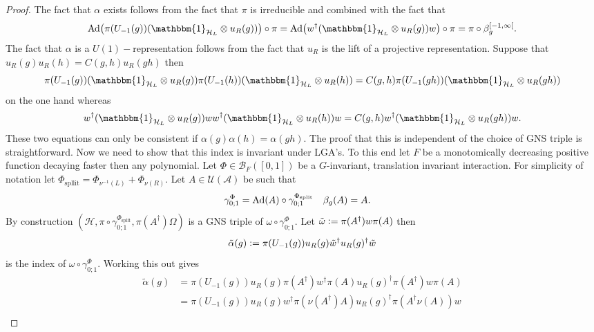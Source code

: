 \documentclass[12pt,a4paper,twoside]{article}
\newcommand{\defeq}{\vcentcolon=}
\let\originalleft\left
\let\originalright\right
\renewcommand{\left}{\mathopen{}\mathclose\bgroup\originalleft}
\renewcommand{\right}{\aftergroup\egroup\originalright}
\newcommand{\UU}{\mathcal U}
\newcommand{\BB}{\mathcal B}
\newcommand{\HH}{\mathcal H}
\renewcommand{\AA}{\mathcal A}
\newcommand{\id}{\mathbbm{1}}
\newcommand{\Ad}[1]{\textrm{Ad}\left(#1\right)}
\theoremstyle{definition}
\numberwithin{equation}{section}
\begin{document}
\begin{proof}
	The fact that $\alpha$ exists follows from the fact that $\pi$ is irreducible and combined with the fact that
	\begin{equation}
		\Ad{\pi(U_{-1}(g)) (\id_{\HH_L}\otimes u_R(g))}\circ\pi=\Ad{w^\dagger(\id_{\HH_L}\otimes u_R(g)) w}\circ\pi=\pi\circ\beta_g^{[-1,\infty[}.
	\end{equation}
	The fact that $\alpha$ is a $U(1)-$representation follows from the fact that $u_R$ is the lift of a projective representation. Suppose that $u_R(g)u_R(h)=C(g,h)u_R(gh)$ then
	\begin{equation}
		\pi(U_{-1}(g)) (\id_{\HH_L}\otimes u_R(g))\pi(U_{-1}(h)) (\id_{\HH_L}\otimes u_R(h))=C(g,h)\pi(U_{-1}(gh)) (\id_{\HH_L}\otimes u_R(gh))
	\end{equation}
	on the one hand whereas
	\begin{equation}
		w^\dagger(\id_{\HH_L}\otimes u_R(g)) ww^\dagger(\id_{\HH_L}\otimes u_R(h)) w=C(g,h)w^\dagger(\id_{\HH_L}\otimes u_R(gh)) w.
	\end{equation}
	These two equations can only be consistent if $\alpha(g)\alpha(h)=\alpha(gh)$. The proof that this is independent of the choice of GNS triple is straightforward. Now we need to show that this index is invariant under LGA's. To this end let $F$ be a monotomically decreasing positive function decaying faster then any polynomial. Let $\Phi\in\BB_F([0,1])$ be a $G$-invariant, translation invariant interaction. For simplicity of notation let $\Phi_{\text{spllit}}=\Phi_{\nu^{-1}(L)}+\Phi_{\nu(R)}$. Let $A\in\UU(\AA)$ be such that
	\begin{align}\label{eq:DefinitionSplitting1DAppendix}
		\gamma^\Phi_{0;1}&=\Ad{A}\circ\gamma^{\Phi_{\text{split}}}_{0;1}&\beta_g(A)&=A.
	\end{align}
	By construction $(\HH,\pi\circ\gamma^{\Phi_{\text{split}}}_{0;1},\pi(A^\dagger)\Omega)$ is a GNS triple of $\omega\circ\gamma^\Phi_{0;1}$. Let $\tilde{\omega}\defeq \pi(A^\dagger)w\pi(A)$ then
	\begin{equation}
		\tilde{\alpha}(g)\defeq \pi(U_{-1}(g))u_R(g)\tilde{w}^\dagger u_R(g)^\dagger \tilde{w}
	\end{equation}
	is the index of $\omega\circ\gamma^\Phi_{0;1}$. Working this out gives
	\begin{align}
		\tilde{\alpha}(g)&=\pi(U_{-1}(g))u_R(g)\pi(A^\dagger)w^\dagger\pi(A)u_R(g)^\dagger\pi(A^\dagger)w\pi(A)\\
		&=\pi(U_{-1}(g))u_R(g)w^\dagger \pi(\nu(A^\dagger)A)u_R(g)^\dagger\pi(A^\dagger\nu(A))w\\

\end{align}
\end{proof}
\end{document}
